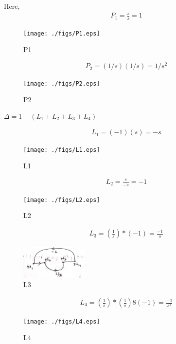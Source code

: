 \begin{enumerate}[label=\thesection.\arabic*.,ref=\thesection.\theenumi]
Here, 
\begin{align}
P_1=\frac{s}{s}=1
\end{align}

\begin{figure}
\centering
\texttt{[image: ./figs/P1.eps]}
\caption{P1}
\label{fig:sec_order}
\end{figure}

 
\begin{align}
P_2=(1/s)(1/s)=1/s^2
\end{align}

\begin{figure}
\centering
\texttt{[image: ./figs/P2.eps]}
\caption{P2}
\label{fig:sec_order}
\end{figure}


$\Delta = 1-(L_1 + L_2 + L_3 + L_4)$

\begin{align}
L_1=(-1)(s)=-s
\end{align}

\begin{figure}
\centering
\texttt{[image: ./figs/L1.eps]}
\caption{L1}
\label{fig:sec_order}
\end{figure}


\begin{align}
L_2=\frac{s}{-s}=-1
\end{align}

\begin{figure}
\centering
\texttt{[image: ./figs/L2.eps]}
\caption{L2}
\label{fig:sec_order}
\end{figure}


\begin{align}
L_3=(\frac{1}{s})*(-1)=\frac{-1}{s}
\end{align}

\begin{figure}
\centering
\includegraphics[width=0.3\textwidth]{./figs/L3.eps}
\caption{L3}
\label{fig:sec_order}
\end{figure}


\begin{align}
L_4=(\frac{1}{s})*(\frac{1}{s})8(-1)=\frac{-1}{s^2}
\end{align}

\begin{figure}
\centering
\texttt{[image: ./figs/L4.eps]}
\caption{L4}
\label{fig:sec_order}
\end{figure}



\end{enumerate}
